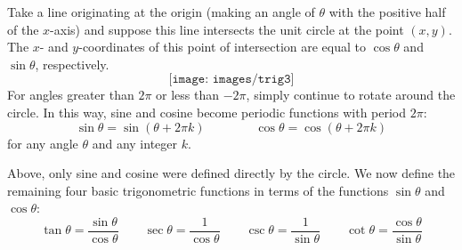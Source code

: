 Take a line originating at the origin (making an angle of $\theta$ with the positive half of the $x$-axis) and suppose this line intersects the unit circle at the point $(x,y)$.
The $x$- and $y$-coordinates of this point of intersection are equal to $\cos\theta$ and $\sin\theta$, respectively.
$$\texttt{[image: images/trig3]}$$
For angles greater than $2\pi$ or less than $-2\pi$, simply continue to rotate around the circle.
In this way, sine and cosine become periodic functions with period $2\pi$:
$$\sin\theta = \sin\left(\theta + 2\pi k \right)\qquad\qquad \cos\theta = \cos\left(\theta + 2\pi k \right)$$
for any angle $\theta$ and any integer $k$.

Above, only sine and cosine were defined directly by the circle.
We now define the remaining four basic trigonometric functions in terms of the functions $\sin\theta$ and $\cos\theta$:
$$\tan\theta = \frac{\sin\theta}{\cos\theta} \qquad \sec\theta = \frac{1}{\cos\theta} \qquad \csc\theta = \frac{1}{\sin\theta} \qquad \cot\theta = \frac{\cos\theta}{\sin\theta}$$